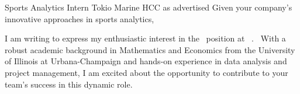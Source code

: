
{\position}{Sports Analytics Intern}
{\company}{Tokio Marine HCC}
{\source}{as advertised}
{\companynews}{Given your company's innovative approaches in sports analytics,}

I am writing to express my enthusiastic interest in the \position\ position at \company\ \source. \companynews\ With a robust academic background in Mathematics and Economics from the University of Illinois at Urbana-Champaign and hands-on experience in data analysis and project management, I am excited about the opportunity to contribute to your team's success in this dynamic role.
